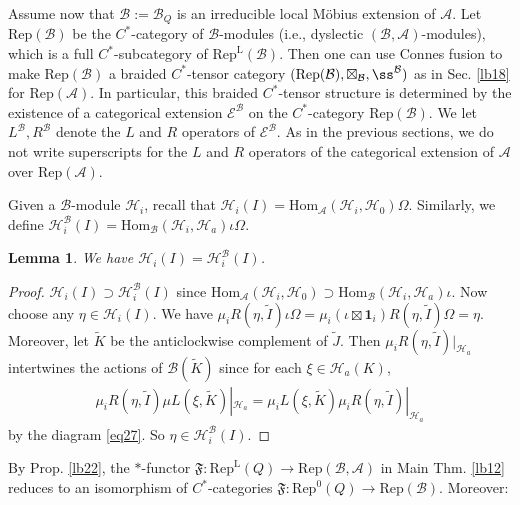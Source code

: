 \documentclass[11pt,b5paper,notitlepage]{article}
\theoremstyle{definition}
\theoremstyle{plain}
\newtheorem{lm}[df]{Lemma}
\newcommand{\fk}{\mathfrak}
\newcommand{\mc}{\mathcal}
\newcommand{\wtd}{\widetilde}
\newcommand{\id}{\mathbf{1}}
\newcommand{\Hom}{\mathrm{Hom}}
\newcommand{\Rep}{\mathrm{Rep}}
\newcommand{\scr}{\mathscr}
\newcommand{\RepA}{\mathrm{Rep}(\mathcal A)}
\newcommand{\RepL}{\mathrm{Rep}^{\mathrm{L}}}
\numberwithin{equation}{section}
\begin{document}
Assume now that $\mc B:=\mc B_Q$ is an irreducible local M\"obius extension of $\mc A$. Let $\Rep(\mc B)$ be the $C^*$-category of $\mc B$-modules (i.e., dyslectic $(\mc B,\mc A)$-modules), which is a full $C^*$-subcategory of $\RepL(\mc B)$. Then one can use Connes fusion to make $\Rep(\mc B)$ a braided $C^*$-tensor category $(\Rep(\mc B),\boxtimes_{\mc B},\ss^{\mc B})$  as in Sec. \ref{lb18} for $\RepA$. In particular, this braided $C^*$-tensor structure is determined by the existence of a categorical extension $\scr E^{\mc B}$ on the $C^*$-category $\Rep(\mc B)$. We let $L^{\mc B},R^{\mc B}$ denote the $L$ and $R$ operators of $\scr E^{\mc B}$. As in the previous sections, we do not write superscripts for the $L$ and $R$ operators of the categorical extension of $\mc A$ over $\RepA$.

Given a $\mc B$-module $\mc H_i$, recall that $\mc H_i(I)=\Hom_{\mc A}(\mc H_i,\mc H_0)\Omega$. Similarly, we define $\mc H_i^{\mc B}(I)=\Hom_{\mc B}(\mc H_i,\mc H_a)\iota\Omega$.
\begin{lm}
We have $\mc H_i(I)=\mc H_i^{\mc B}(I)$.
\end{lm}
\begin{proof}
$\mc H_i(I)\supset\mc H_i^{\mc B}(I)$ since $\Hom_{\mc A}(\mc H_i,\mc H_0)\supset\Hom_{\mc B}(\mc H_i,\mc H_a)\iota$. Now choose any $\eta\in\mc H_i(I)$. We have $\mu_i R(\eta,\wtd I)\iota\Omega=\mu_i(\iota\boxtimes\id_i)R(\eta,\wtd I)\Omega=\eta$. Moreover, let $\wtd K$ be the anticlockwise complement of $\wtd J$. Then $\mu_i R(\eta,\wtd I)|_{\mc H_a}$ intertwines the actions of $\mc B(\wtd K)$ since for each $\xi\in\mc H_a(K)$, 
\begin{align*}
	\mu_i R(\eta,\wtd I)\mu L(\xi,\wtd K)|_{\mc H_a}=\mu_i L(\xi,\wtd K)\mu_i R(\eta,\wtd I)|_{\mc H_a}	
\end{align*}
by the diagram \eqref{eq27}. So $\eta\in \mc H_i^{\mc B}(I)$.
\end{proof}






By Prop. \ref{lb22}, the $*$-functor $\fk F:\RepL(Q)\rightarrow\Rep(\mc B,\mc A)$ in Main Thm. \ref{lb12} reduces to an isomorphism of $C^*$-categories $\fk F:\Rep^0(Q)\rightarrow\Rep(\mc B)$. Moreover:
\end{document}
